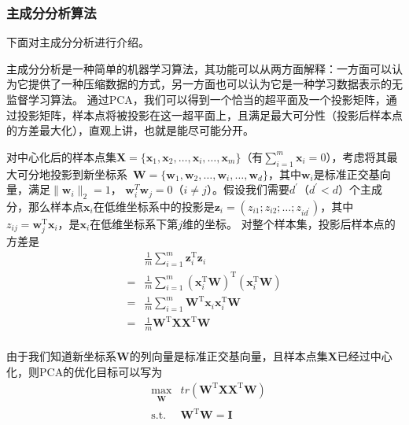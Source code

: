 \documentclass[a4paper,AutoFakeBold,oneside,12pt]{book}
\begin{document}
\subsubsection{主成分分析算法}

下面对主成分分析进行介绍。

主成分分析是一种简单的机器学习算法，其功能可以从两方面解释：一方面可以认为它提供了一种压缩数据的方式，另一方面也可以认为它是一种学习数据表示的无监督学习算法。\cite{Goodfellow2016DeepLearning}
通过PCA，我们可以得到一个恰当的超平面及一个投影矩阵，通过投影矩阵，样本点将被投影在这一超平面上，且满足最大可分性（投影后样本点的方差最大化），直观上讲，也就是能尽可能分开。

对中心化后的样本点集$\bm{X}=\{\bm{x}_1,\bm{x}_2,\ldots,\bm{x}_i,\ldots,\bm{x}_m\}$（有$\sum_{i=1}^{m}\bm{x}_i = 0$），考虑将其最大可分地投影到新坐标系\ $\bm{W}= \{\bm{w}_1,\bm{w}_2,\ldots,\bm{w}_i,\ldots,\bm{w}_d\} $，其中$\bm{w}_i$是标准正交基向量，满足$\|\bm{w}_i\|_2 = 1$， $\bm{w}_i^T\bm{w}_j = 0$（$i \not= j$）。假设我们需要$d^\prime$（$d^\prime < d$）个主成分，那么样本点$\bm{x}_i$在低维坐标系中的投影是$\bm{z}_i = (z_{i1};z_{i2};\ldots;z_{id^\prime})$，其中$z_{ij} = \bm{w}_j^\mathrm{T}\bm{x}_i$，是$\bm{x}_i$在低维坐标系下第$j$维的坐标。
对整个样本集，投影后样本点的方差是
\begin{equation}
\begin{aligned}
    & \frac{1}{m}\sum_{i=1}^m \bm{z}_i^\mathrm{T}\bm{z}_i \\
= & \frac{1}{m}\sum_{i=1}^m (\bm{x}_i^\mathrm{T}\bm{W})^\mathrm{T}(\bm{x}_i^\mathrm{T}\bm{W}) \\
= & \frac{1}{m}\sum_{i=1}^m \bm{W}^\mathrm{T}\bm{x}_i\bm{x}_i^\mathrm{T}\bm{W} \\
= & \frac{1}{m} \bm{W}^\mathrm{T}\bm{X}\bm{X}^\mathrm{T}\bm{W} \\
\end{aligned}
\end{equation}

由于我们知道新坐标系$\bm{W}$的列向量是标准正交基向量，且样本点集$\bm{X}$已经过中心化，则PCA的优化目标可以写为
\begin{equation}
\label{PCA_goal_TMP}
\begin{aligned}
& \max_{\substack{\bm{W}}}  &  tr(\bm{W}^\mathrm{T}\bm{X}\bm{X}^ \mathrm{T}\bm{W}) \\
& \operatorname{ s.t. }  &  \bm{W}^\mathrm{T}\bm{W} = \bm{I} \\
\end{aligned}
\end{equation}
\end{document}
